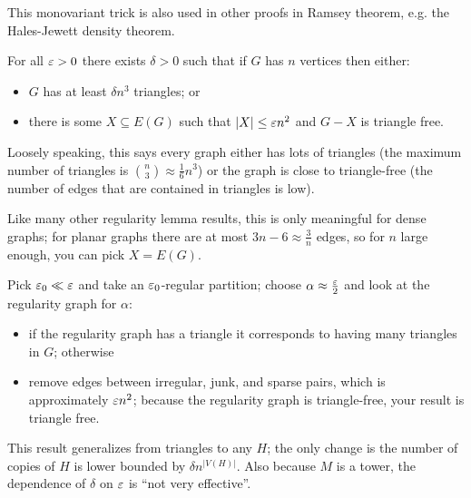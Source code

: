 \documentclass[main.tex]{subfiles}
\begin{document}
%
This monovariant trick is also used in other proofs in Ramsey theorem,
e.g. the Hales-Jewett density theorem.

\begin{lemma}
  For all $\varepsilon > 0$ there exists $\delta > 0$ such that if $G$ has $n$ vertices
  then either:
  \begin{itemize}
    \item $G$ has at least $\delta n^3$ triangles; or
    \item there is some $X\subseteq E(G)$ such that $|X|\leq\varepsilon n^2$ and
      $G - X$ is triangle free.
  \end{itemize}
\end{lemma}
Loosely speaking, this says every graph either has lots of triangles
(the maximum number of triangles is $\binom{n}{3}\approx\frac{1}{6}n^3$)
or the graph is close to triangle-free (the number of edges that are contained
in triangles is low).

Like many other regularity lemma results, this is only meaningful for dense
graphs; for planar graphs there are at most $3n-6\approx\frac{3}{n}$ edges,
so for $n$ large enough, you can pick $X = E(G)$.
\begin{motivation*}
  Pick $\varepsilon_0\ll\varepsilon$ and take an $\varepsilon_0$-regular partition; choose
  $\alpha\approx\frac{\varepsilon}{2}$ and look at the regularity graph for $\alpha$:
  \begin{itemize}
    \item if the regularity graph has a triangle it corresponds to having
      many triangles in $G$; otherwise

    \item remove edges between irregular, junk, and sparse pairs, which is
      approximately $\varepsilon n^2$; because the regularity graph is triangle-free,
      your result is triangle free.
  \end{itemize}
\end{motivation*}
This result generalizes from triangles to any $H$; the only change is the
number of copies of $H$ is lower bounded by $\delta n^{|V(H)|}$.
Also because $M$ is a tower, the dependence of $\delta$ on $\varepsilon$ is
``not very effective''.
\end{document}
